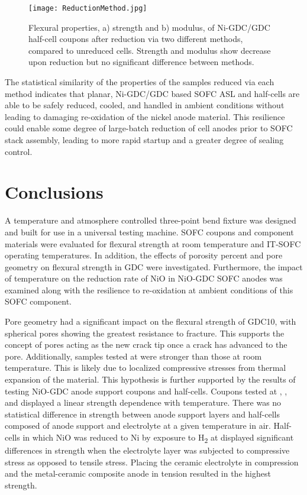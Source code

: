\begin{figure}
    \texttt{[image: ReductionMethod.jpg]}
    \caption{Flexural properties, a) strength and b) modulus, of Ni-GDC/GDC half-cell coupons after reduction via two different methods, compared to unreduced cells. Strength and modulus show decrease upon reduction but no significant difference between methods.}
    \label{fig:reductionmethod}
\end{figure}

The statistical similarity of the properties of the samples reduced via each method indicates that planar, Ni-GDC/GDC based SOFC ASL and half-cells are able to be safely reduced, cooled, and handled in ambient conditions without leading to damaging re-oxidation of the nickel anode material.
This resilience could enable some degree of large-batch reduction of cell anodes prior to SOFC stack assembly, leading to more rapid startup and a greater degree of sealing control.

\section{Conclusions}

A temperature and atmosphere controlled three-point bend fixture was designed and built for use in a universal testing machine.
SOFC coupons and component materials were evaluated for flexural strength at room temperature and IT-SOFC operating temperatures.
In addition, the effects of porosity percent and pore geometry on flexural strength in GDC were investigated.
Furthermore, the impact of temperature on the reduction rate of NiO in NiO-GDC SOFC anodes was examined along with the resilience to re-oxidation at ambient conditions of this SOFC component.

Pore geometry had a significant impact on the flexural strength of
GDC10, with spherical pores showing the greatest resistance to fracture.
This supports the concept of pores acting as the new crack tip once a crack has advanced to the pore.
Additionally, samples tested at  were stronger than those at room temperature.
This is likely due to localized compressive stresses from thermal expansion of the material.
This hypothesis is further supported by the results of testing NiO-GDC
anode support coupons and half-cells.
Coupons tested at , , and  displayed a linear strength dependence with temperature.
There was no statistical difference in strength between anode support layers and half-cells composed of anode support and electrolyte at a given temperature in air.
Half-cells in which NiO was reduced to Ni by exposure to H\textsubscript{2} at  displayed significant differences in strength when the electrolyte layer was subjected to compressive stress as opposed to tensile stress.
Placing the ceramic electrolyte in compression and the metal-ceramic composite anode in tension resulted in the highest strength.

